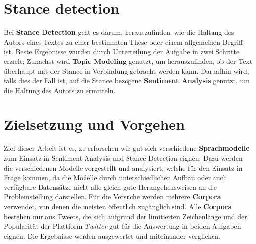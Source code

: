 \section{Stance detection}
Bei \textbf{Stance Detection} geht es darum, herauszufinden, wie die Haltung des Autors eines Textes zu einer bestimmten These oder einem allgemeinen Begriff ist. Beste Ergebnisse wurden durch Unterteilung der Aufgabe in zwei Schritte erzielt; Zun\"achst wird \textbf{Topic Modeling} genutzt, um herauszufinden, ob der Text \"uberhaupt mit der Stance in Verbindung gebracht werden kann. Daruafhin wird, falls dies der Fall ist, auf die Stance bezogene \textbf{Sentiment Analysis} genutzt, um die Haltung des Autors zu ermitteln.


\section{Zielsetzung und Vorgehen}
Ziel dieser Arbeit ist es, zu erforschen wie gut sich verschiedene \textbf{Sprachmodelle} zum Einsatz in  Sentiment Analysis und Stance Detection eignen.
Dazu werden die verschiedenen Modelle vorgestellt und analysiert, welche f\"ur den Einsatz in Frage kommen, da die Modelle durch unterschiedlichen Aufbau oder auch verf\"ugbare Datens\"atze nicht alle gleich gute Herangehensweisen an die Problemstellung darstellen.
F\"ur die Versuche werden mehrere \textbf{Corpora} verwendet, von denen die meisten \"offentlich zug\"anglich sind. Alle  \textbf{Corpora} bestehen nur aus Tweets, die sich aufgrund der limitierten Zeichenl\"ange und der Popularit\"at  der Plattform \textit{Twitter} gut f\"ur die Auswertung in beiden Aufgaben eignen.
Die Ergebnisse werden ausgewertet und miteinander verglichen.




